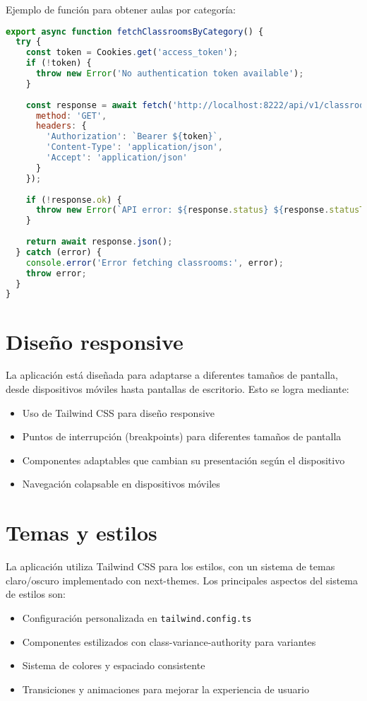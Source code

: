 \documentclass[12pt,a4paper]{report}
\begin{document}
Ejemplo de función para obtener aulas por categoría:

\begin{lstlisting}[language=JavaScript, caption=Función para obtener aulas por categoría]
export async function fetchClassroomsByCategory() {
  try {
    const token = Cookies.get('access_token');
    if (!token) {
      throw new Error('No authentication token available');
    }
    
    const response = await fetch('http://localhost:8222/api/v1/classrooms', {
      method: 'GET',
      headers: {
        'Authorization': `Bearer ${token}`,
        'Content-Type': 'application/json',
        'Accept': 'application/json'
      }
    });
    
    if (!response.ok) {
      throw new Error(`API error: ${response.status} ${response.statusText}`);
    }
    
    return await response.json();
  } catch (error) {
    console.error('Error fetching classrooms:', error);
    throw error;
  }
}
\end{lstlisting}

\section{Diseño responsive}
La aplicación está diseñada para adaptarse a diferentes tamaños de pantalla, desde dispositivos móviles hasta pantallas de escritorio. Esto se logra mediante:

\begin{itemize}
    \item Uso de Tailwind CSS para diseño responsive
    \item Puntos de interrupción (breakpoints) para diferentes tamaños de pantalla
    \item Componentes adaptables que cambian su presentación según el dispositivo
    \item Navegación colapsable en dispositivos móviles
\end{itemize}

\section{Temas y estilos}
La aplicación utiliza Tailwind CSS para los estilos, con un sistema de temas claro/oscuro implementado con next-themes. Los principales aspectos del sistema de estilos son:

\begin{itemize}
    \item Configuración personalizada en \texttt{tailwind.config.ts}
    \item Componentes estilizados con class-variance-authority para variantes
    \item Sistema de colores y espaciado consistente
    \item Transiciones y animaciones para mejorar la experiencia de usuario
\end{itemize}
\end{document}
